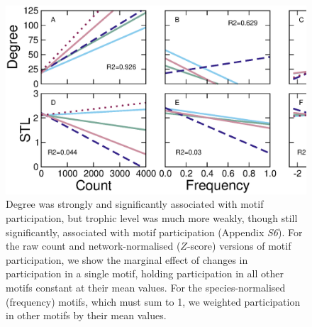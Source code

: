 \documentclass[12pt]{article}
\begin{document}
    \begin{figure}[ht!]
        \centering
        \includegraphics[width=\textwidth]{figures/motifs_vs_degTL.eps}
        \caption{Degree was strongly and significantly associated with motif participation, but trophic level was much more weakly, though still significantly, associated with motif participation (Appendix \emph{S6}). For the raw count and network-normalised ($Z$-score) versions of motif participation, we show the marginal effect of changes in participation in a single motif, holding participation in all other motifs constant at their mean values. For the species-normalised (frequency) motifs, which must sum to 1, we weighted participation in other motifs by their mean values. }
        \label{fig:motifs_degTL}
    \end{figure}

    \clearpage
\end{document}
